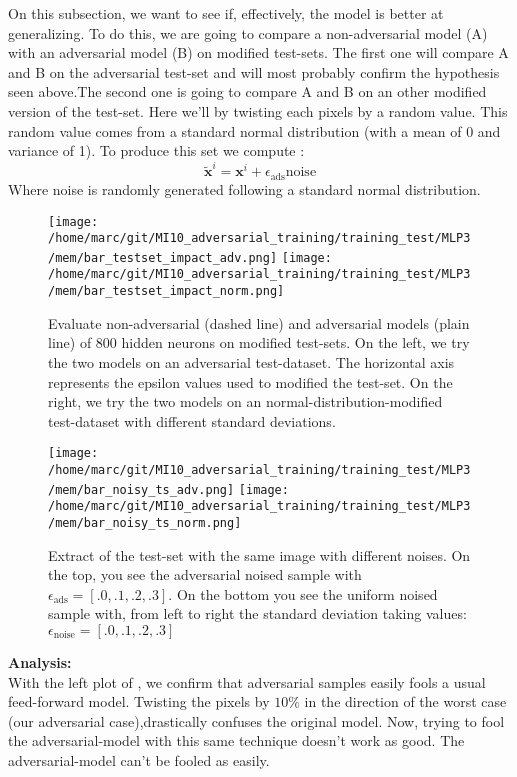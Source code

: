 			On this subsection, we want to see if, effectively, the model is better at generalizing. To do this, we are going to compare a non-adversarial model (A) with an adversarial model (B) on modified test-sets. The first one will compare A and B on the adversarial test-set and will most probably confirm the hypothesis seen above.The second one is going to compare A and B on an other modified version of the test-set. Here we'll by twisting each pixels by a random value. This random value comes from a standard normal distribution (with a mean of 0 and variance of 1). To produce this set we compute :
			$$ \tilde{\boldsymbol{x}}^i = \boldsymbol{x}^i + \epsilon_{\text{ads}} \text{noise} $$
			Where noise is randomly generated following a standard normal distribution.
			
			\begin{figure}
				\centering
				\texttt{[image: /home/marc/git/MI10\_adversarial\_training/training\_test/MLP3/mem/bar\_testset\_impact\_adv.png]}
				\texttt{[image: /home/marc/git/MI10\_adversarial\_training/training\_test/MLP3/mem/bar\_testset\_impact\_norm.png]}
				\caption{Evaluate non-adversarial (dashed line) and adversarial models (plain line) of 800 hidden neurons on modified test-sets. On the left, we try the two models on an adversarial test-dataset. The horizontal axis represents the epsilon values used to modified the test-set. On the right, we try the two models on an normal-distribution-modified test-dataset with different standard deviations.}
				\label{fig:mnist_adv_noisy_ds}
			\end{figure}
			\begin{figure}
				\centering
				\texttt{[image: /home/marc/git/MI10\_adversarial\_training/training\_test/MLP3/mem/bar\_noisy\_ts\_adv.png]}
				\texttt{[image: /home/marc/git/MI10\_adversarial\_training/training\_test/MLP3/mem/bar\_noisy\_ts\_norm.png]}
				\caption{Extract of the test-set with the same image with different noises. On the top, you see the adversarial noised sample with $\epsilon_{\text{ads}} = [.0, .1, .2, .3]$. On the bottom you see the uniform noised sample with, from left to right the standard deviation taking values: $\epsilon_{\text{noise}} = [.0, .1, .2, .3]$}
				\label{fig:mnist_adv_noisy_ds_img}
			\end{figure}

			\vskip 1cm
			\textbf{Analysis:}\\
			With the left plot of , we confirm that adversarial samples easily fools a usual feed-forward model. Twisting the pixels by $10\%$ in the direction of the worst case (our adversarial case),drastically confuses the original model. Now, trying to fool the adversarial-model with this same technique doesn't work as good. The adversarial-model can't be fooled as easily. 


